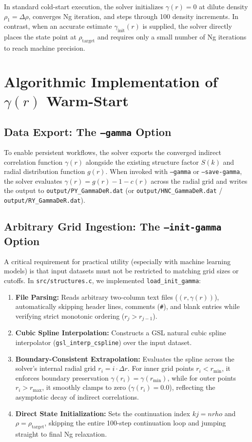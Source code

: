\documentclass[11pt,a4paper]{article}
\begin{document}
In standard cold-start execution, the solver initializes $\gamma(r) = 0$ at dilute density $\rho_1 = \Delta \rho$, converges Ng iteration, and steps through 100 density increments. In contrast, when an accurate estimate $\gamma_{\text{init}}(r)$ is supplied, the solver directly places the state point at $\rho_{\text{target}}$ and requires only a small number of Ng iterations to reach machine precision.

\section{Algorithmic Implementation of $\gamma(r)$ Warm-Start}

\subsection{Data Export: The \texttt{--gamma} Option}
To enable persistent workflows, the solver exports the converged indirect correlation function $\gamma(r)$ alongside the existing structure factor $S(k)$ and radial distribution function $g(r)$. When invoked with \texttt{--gamma} or \texttt{--save-gamma}, the solver evaluates $\gamma(r) = g(r) - 1 - c(r)$ across the radial grid and writes the output to \texttt{output/PY\_GammaDeR.dat} (or \texttt{output/HNC\_GammaDeR.dat} / \texttt{output/RY\_GammaDeR.dat}).

\subsection{Arbitrary Grid Ingestion: The \texttt{--init-gamma} Option}
A critical requirement for practical utility (especially with machine learning models) is that input datasets must not be restricted to matching grid sizes or cutoffs. In \texttt{src/structures.c}, we implemented \texttt{load\_init\_gamma}:
\begin{enumerate}
    \item \textbf{File Parsing:} Reads arbitrary two-column text files ($(r, \gamma(r))$), automatically skipping header lines, comments (\texttt{\#}), and blank entries while verifying strict monotonic ordering ($r_{j} > r_{j-1}$).
    \item \textbf{Cubic Spline Interpolation:} Constructs a GSL natural cubic spline interpolator (\texttt{gsl\_interp\_cspline}) over the input dataset.
    \item \textbf{Boundary-Consistent Extrapolation:} Evaluates the spline across the solver's internal radial grid $r_i = i \cdot \Delta r$. For inner grid points $r_i < r_{\min}$, it enforces boundary preservation $\gamma(r_i) = \gamma(r_{\min})$, while for outer points $r_i > r_{\max}$, it smoothly clamps to zero ($\gamma(r_i) = 0.0$), reflecting the asymptotic decay of indirect correlations.
    \item \textbf{Direct State Initialization:} Sets the continuation index $kj = nrho$ and $\rho = \rho_{\text{target}}$, skipping the entire 100-step continuation loop and jumping straight to final Ng relaxation.
\end{enumerate}
\end{document}
